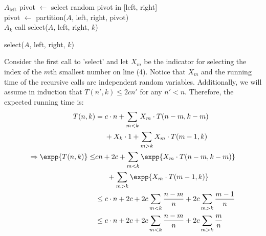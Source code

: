 \begin{algorithm}
 { 
  \Return $A_{\text{left}}$
  }
  pivot $\leftarrow$ select random pivot in [left, right]\\
  pivot $\leftarrow$ partition($A$, left, right, pivot) \\
   {
    \Return $A_{k}$
  }
  \Return call select($A$, left, right,  $k$)

  \caption{select($A$, left, right,  $k$)}
\end{algorithm}
Consider the first call to 'select' and let $X_m$ be the indicator for selecting the index of the $m$th smallest number on line (4). Notice that $X_m$ and the running time of the recursive calls are independent random variables. Additionally, we will assume in induction that $T(n', k) \le 2cn'$ for any $n' < n$. Therefore, the expected running time is:
\begin{equation*}
  \begin{split}
    T(n,k) &= c\cdot n + \sum_{m < k}{ X_{m} \cdot T(n-m, k -m)} \\ 
    & \ \ \ \ + X_{k} \cdot 1  + \sum_{m > k}{ X_{m} \cdot T(m-1, k)} \\ 
     \Rightarrow \expp{T(n,k)} \le & cn +2c  + \sum_{m < k}{ \expp{X_{m} \cdot T(n-m, k -m)}} \\
    & \ \ \ \  \  + \sum_{m > k}{\expp{ X_{m} \cdot T(m-1, k) }} \\ 
    & \le c\cdot n + 2c +  2c \sum_{m < k}{ \frac{n-m}{n} }  + 2c\sum_{m > k}{ \frac{m-1}{n}} \\
    & \le c\cdot n + 2c +  2c \sum_{m < k}{ \frac{n-m}{n} }  + 2c\sum_{m > k}{ \frac{m}{n}} 
  \end{split}
\end{equation*}

